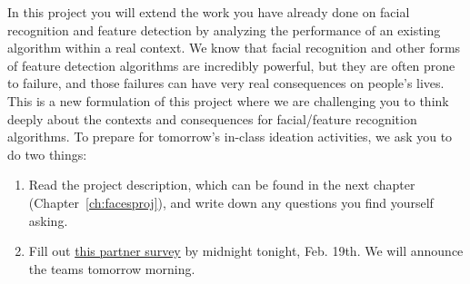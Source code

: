 In this project you will extend the work you have already done on facial recognition and feature detection by analyzing the performance of an existing algorithm within a real context. We know that facial recognition and other forms of feature detection algorithms are incredibly powerful, but they are often prone to failure, and those failures can have very real consequences on people's lives. This is a new formulation of this project where we are challenging you to think deeply about the contexts and consequences for facial/feature recognition algorithms. To prepare for tomorrow's in-class ideation activities, we ask you to do two things:
\begin{enumerate}
    \item Read the project description, which can be found in the next chapter (Chapter~\ref{ch:facesproj}), and write down any questions you find yourself asking.
    \item Fill out \href{https://docs.google.com/forms/d/e/1FAIpQLSfMbSQudUCL1xaCBpK-fzNweDwRYuSitGRDiA5PbsVmnrnPbA/viewform?usp=sf_link}{this partner survey} by midnight tonight, Feb. 19th. We will announce the teams tomorrow morning.
\end{enumerate}

\pagebreak
\shipoutAnswer